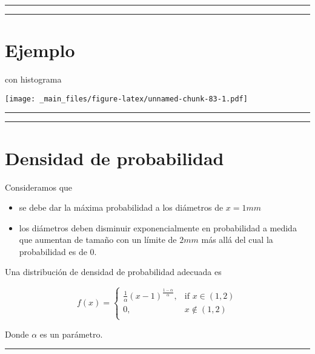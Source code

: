 \documentclass[
]{book}
\providecommand{\tightlist}{%
  \setlength{\itemsep}{0pt}\setlength{\parskip}{0pt}}
\begin{document}
\begin{center}\rule{0.5\linewidth}{0.5pt}\end{center}

\begin{center}\rule{0.5\linewidth}{0.5pt}\end{center}

\hypertarget{ejemplo-14}{%
\section{Ejemplo}\label{ejemplo-14}}

con histograma

\texttt{[image: \_main\_files/figure-latex/unnamed-chunk-83-1.pdf]}

\begin{center}\rule{0.5\linewidth}{0.5pt}\end{center}

\begin{center}\rule{0.5\linewidth}{0.5pt}\end{center}

\hypertarget{densidad-de-probabilidad}{%
\section{Densidad de probabilidad}\label{densidad-de-probabilidad}}

Consideramos que

\begin{itemize}
\tightlist
\item
  se debe dar la máxima probabilidad a los diámetros de \(x=1mm\)
\item
  los diámetros deben disminuir exponencialmente en probabilidad a medida que aumentan de tamaño con un límite de \(2mm\) más allá del cual la probabilidad es de \(0\).
\end{itemize}

Una distribución de densidad de probabilidad adecuada es

\[
    f(x)= 
\begin{cases}
\frac{1}{\alpha}(x-1)^{\frac{1-\alpha}{\alpha}},& \text{if } x \in (1,2)\\
    0,& x \notin (1,2)\\
\end{cases}
\]

Donde \(\alpha\) es un parámetro.

\begin{center}\rule{0.5\linewidth}{0.5pt}\end{center}
\end{document}
